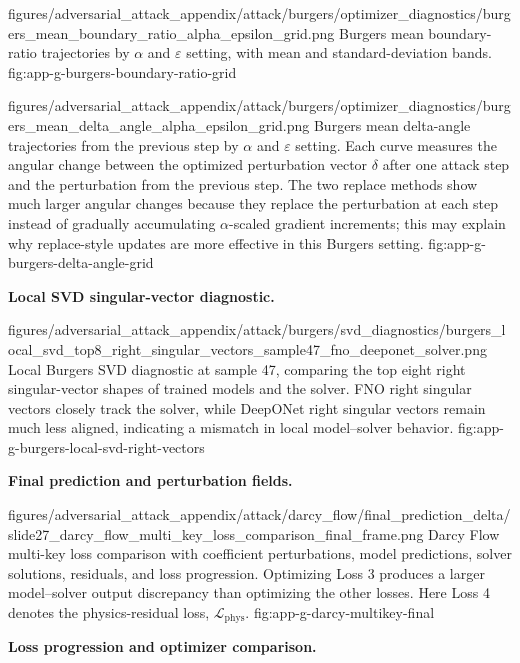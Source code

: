 \documentclass[letterpaper]{article} %
\newcounter{appendixsection}
\newcounter{appendixsubsection}[appendixsection]
\newcounter{appendixdomain}[appendixsubsection]
\begin{document}
\appendixattackfig
  {figures/adversarial_attack_appendix/attack/burgers/optimizer_diagnostics/burgers_mean_boundary_ratio_alpha_epsilon_grid.png}
  {Burgers mean boundary-ratio trajectories by $\alpha$ and $\varepsilon$ setting,
  with mean and standard-deviation bands.}
  {fig:app-g-burgers-boundary-ratio-grid}

\appendixattackfig
  {figures/adversarial_attack_appendix/attack/burgers/optimizer_diagnostics/burgers_mean_delta_angle_alpha_epsilon_grid.png}
  {Burgers mean delta-angle trajectories from the previous step by $\alpha$ and
  $\varepsilon$ setting. Each curve measures the angular change between the
  optimized perturbation vector $\delta$ after one attack step and the
  perturbation from the previous step. The two replace methods show much larger
  angular changes because they replace the perturbation at each step instead of
  gradually accumulating $\alpha$-scaled gradient increments; this may explain
  why replace-style updates are more effective in this Burgers setting.}
  {fig:app-g-burgers-delta-angle-grid}

\noindent\textbf{Local SVD singular-vector diagnostic.}

\appendixattackfig
  {figures/adversarial_attack_appendix/attack/burgers/svd_diagnostics/burgers_local_svd_top8_right_singular_vectors_sample47_fno_deeponet_solver.png}
  {Local Burgers SVD diagnostic at sample 47, comparing the top eight right
  singular-vector shapes of trained models and the solver. FNO right singular
  vectors closely track the solver, while DeepONet right singular vectors remain
  much less aligned, indicating a mismatch in local model--solver behavior.}
  {fig:app-g-burgers-local-svd-right-vectors}

\FloatBarrier
{}

\noindent\textbf{Final prediction and perturbation fields.}

\appendixattackfig
  {figures/adversarial_attack_appendix/attack/darcy_flow/final_prediction_delta/slide27_darcy_flow_multi_key_loss_comparison_final_frame.png}
  {Darcy Flow multi-key loss comparison with coefficient perturbations, model
  predictions, solver solutions, residuals, and loss progression. Optimizing
  Loss 3 produces a larger model--solver output discrepancy than optimizing the
  other losses. Here Loss 4 denotes the physics-residual loss,
  $\mathcal{L}_{\mathrm{phys}}$.}
  {fig:app-g-darcy-multikey-final}

\clearpage
\noindent\textbf{Loss progression and optimizer comparison.}
\end{document}
